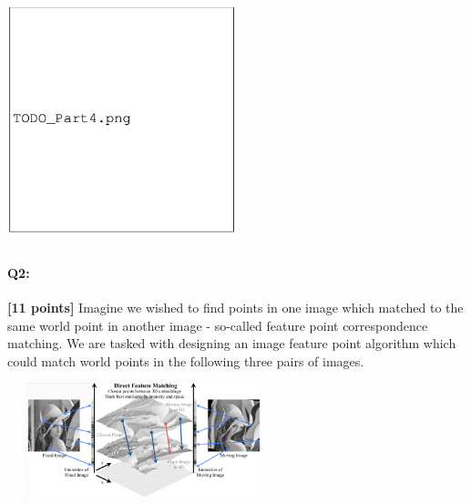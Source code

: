 \documentclass[11pt]{article}
\begin{document}
\begin{tcolorbox}[colback=white!5!white,colframe=green!75!black]
\includegraphics[width=0.5\textwidth,height=7cm,keepaspectratio]{images/TODO_part4.png}
\end{tcolorbox}
\pagebreak

\paragraph{Q2:} \textbf{[11 points]} Imagine we wished to find points in one image which matched to the same world point in another image - so-called feature point correspondence matching. We are tasked with designing an image feature point algorithm which could match world points in the following three pairs of images.

\begin{center}
\includegraphics[width=300px,height=125px]{images/Direct-Feature-Matching-Correspondences-are-established-with-simple-and-fast-nearest.png} 
\end{center}
\end{document}
